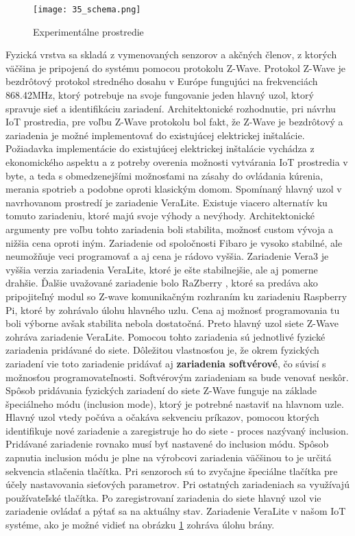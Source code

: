 \begin{figure}[!htbp]
\centering
\texttt{[image: 35\_schema.png]}
\caption{Experimentálne prostredie}
\label{35_schema}
\end{figure} 
Fyzická vrstva sa skladá z vymenovaných senzorov a akčných členov, z ktorých väčšina je pripojená do systému pomocou protokolu Z-Wave. Protokol Z-Wave je bezdrôtový protokol stredného dosahu v Európe fungujúci na frekvenciách 868.42MHz,   ktorý potrebuje na svoje fungovanie jeden hlavný uzol, ktorý spravuje sieť a identifikáciu zariadení. Architektonické rozhodnutie, pri návrhu IoT prostredia, pre voľbu Z-Wave protokolu bol fakt, že Z-Wave je bezdrôtový a zariadenia je možné implementovať do existujúcej elektrickej inštalácie. Požiadavka implementácie do existujúcej elektrickej inštalácie vychádza z ekonomického aspektu a z potreby overenia možnosti vytvárania IoT prostredia v byte, a teda s obmedzenejšími možnosťami na zásahy do ovládania kúrenia, merania spotrieb a podobne oproti klasickým domom. Spomínaný hlavný uzol v navrhovanom prostredí je zariadenie VeraLite. Existuje viacero alternatív ku tomuto zariadeniu, ktoré majú svoje výhody a nevýhody. Architektonické argumenty pre voľbu tohto zariadenia boli stabilita, možnosť custom vývoja a nižšia cena oproti iným. Zariadenie od spoločnosti Fibaro \cite{IOT25} je vysoko stabilné, ale neumožňuje veci programovať a aj cena je rádovo vyššia. Zariadenie Vera3 \cite{IOT27} je vyššia verzia zariadenia VeraLite, ktoré je ešte stabilnejšie, ale aj pomerne drahšie. Ďalšie uvažované zariadenie bolo RaZberry \cite{IOT26}, ktoré sa predáva ako pripojiteľný modul so Z-wave komunikačným rozhraním ku zariadeniu Raspberry Pi, ktoré by zohrávalo úlohu hlavného uzlu. Cena aj možnosť programovania tu boli výborne avšak stabilita nebola dostatočná. Preto hlavný uzol siete Z-Wave zohráva zariadenie VeraLite. Pomocou tohto zariadenia sú jednotlivé fyzické zariadenia pridávané do siete. Dôležitou vlastnosťou je, že okrem fyzických zariadení vie toto zariadenie pridávať aj \textbf{zariadenia softvérové}, čo súvisí s možnosťou programovateľnosti. Softvérovým zariadeniam sa bude venovať neskôr. Spôsob pridávania fyzických zariadení do siete Z-Wave funguje na základe špeciálneho módu (inclusion mode), ktorý je potrebné nastaviť na hlavnom uzle. Hlavný uzol vtedy počúva a očakáva sekvenciu príkazov, pomocou ktorých identifikuje nové zariadenie a zaregistruje ho do siete - proces nazývaný inclusion. Pridávané zariadenie rovnako musí byť nastavené do inclusion módu. Spôsob zapnutia inclusion módu je plne na výrobcovi zariadenia väčšinou to je určitá sekvencia stlačenia tlačítka. Pri senzoroch sú to zvyčajne špeciálne tlačítka pre účely nastavovania sieťových parametrov. Pri ostatných zariadeniach sa využívajú používateľské tlačítka. Po zaregistrovaní zariadenia do siete hlavný uzol vie zariadenie ovládať a pýtať sa na aktuálny stav. Zariadenie VeraLite v našom IoT systéme, ako je možné vidieť na obrázku \ref{35_schema} zohráva úlohu brány. \\
